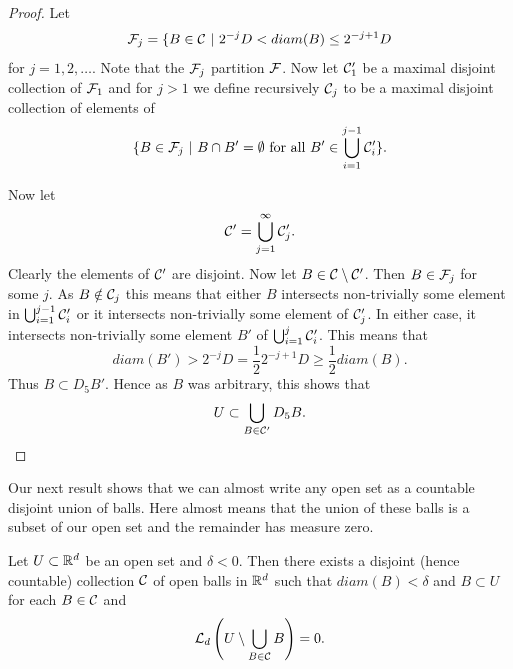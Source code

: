 \documentclass[twoside, a4paper, 10pt]{amsart}
\begin{document}
\begin{proof} Let $$\mathcal{F}_j = \{ B \in \mathcal{C} ~|~ 2^{-j}D< diam(B) \leq 2^{-j+1} D$$ for $j = 1,2,\ldots$. Note that the $\mathcal{F}_j$ partition $\mathcal{F}$. Now let $\mathcal{C}'_1$ be a maximal disjoint collection of $\mathcal{F}_1$ and for $j > 1$ we define recursively $\mathcal{C}_j$ to be a maximal disjoint collection of elements of $$\{ B \in \mathcal{F}_j ~|~ B \cap B' = \emptyset \text{ for all } B' \in \bigcup_{i=1}^{j-1}\mathcal{C}'_{i}\}.$$

 Now let $$\mathcal{C}' = \bigcup_{j=1}^{\infty} \mathcal{C}'_j.$$ Clearly the elements of $\mathcal{C}'$ are disjoint. Now let $B \in \mathcal{C} \setminus \mathcal{C}'$. Then $B \in \mathcal{F}_j$ for some $j$. As $B \notin \mathcal{C}_j$ this means that either $B$ intersects non-trivially some element in $\bigcup_{i=1}^{j-1}\mathcal{C}'_i$ or it intersects non-trivially some element of $\mathcal{C}'_j$. In either case, it intersects non-trivially some element $B'$ of $\bigcup_{i=1}^j \mathcal{C}'_i$. This means that $$diam(B') > 2^{-j}D = \frac{1}{2} 2^{-j+1}D \geq \frac{1}{2} diam(B).$$ Thus $B \subset D_5B'$. Hence as $B$ was arbitrary, this shows that $$U \subset \bigcup_{B \in \mathcal{C}'} D_5B.$$  \end{proof}

Our next result shows that we can almost write any open set as a countable disjoint union of balls. Here almost means that the union of these balls is a subset of our open set and the remainder has measure zero.

\begin{thm} \label{thm: fill open set with balls} Let $U \subset \mathbb{R}^d$ be an open set and $\delta < 0$. Then there exists a disjoint (hence countable) collection $\mathcal{C}$ of open balls in $\mathbb{R}^d$ such that $diam(B) < \delta$ and $B \subset U$ for each $B \in \mathcal{C}$ and $$\mathcal{L}_d\left(U \setminus \bigcup_{B \in \mathcal{C}} B \right) = 0.$$

\end{thm}
\end{document}
